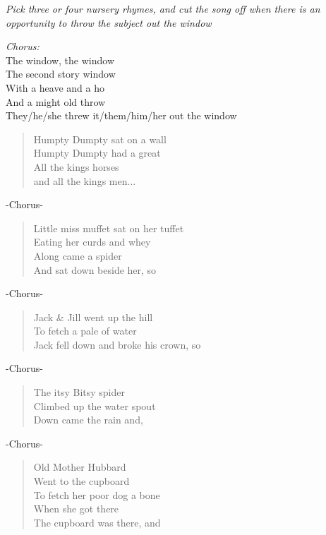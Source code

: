 
\textit{Pick three or four nursery rhymes, and cut the song off when there is an opportunity to throw the subject out the window}

\begin{center}
\textit{Chorus:} \\
The window, the window \\
The second story window \\
With a heave and a ho \\
And a might old throw \\
They/he/she threw it/them/him/her out the window
\end{center}

\begin{verse}
Humpty Dumpty sat on a wall \\
Humpty Dumpty had a great \\
All the kings horses \\
and all the kings men... \\
\end{verse}

-Chorus-

\begin{verse}
Little miss muffet sat on her tuffet \\
Eating her curds and whey \\
Along came a spider \\
And sat down beside her, so \\
\end{verse}

-Chorus-

\begin{verse}
Jack \& Jill went up the hill \\
To fetch a pale of water \\
Jack fell down and broke his crown, so \\
\end{verse}

-Chorus-

\begin{verse}
The itsy Bitsy spider \\
Climbed up the water spout \\
Down came the rain and, \\
\end{verse}

-Chorus-

\begin{verse}
Old Mother Hubbard \\
Went to the cupboard \\
To fetch her poor dog a bone \\
When she got there \\
The cupboard was there, and \\
\end{verse}


